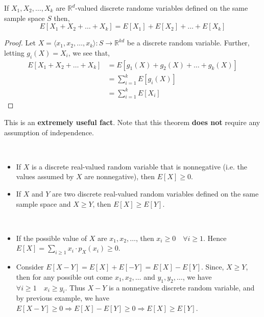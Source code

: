 \begin{theorem}
    If $X_1, X_2, \dots, X_k$ are $\mathbb{R}^d$-valued discrete randome
variables defined on the same sample space $S$ then,
\begin{equation*}
    E[X_1 + X_2 + \dots + X_k] = E[X_1] + E[X_2] + \dots + E[X_k]   
\end{equation*}
\end{theorem}
\begin{proof}
    Let $X = \langle x_1, x_2, \dots, x_k \rangle : S \rightarrow
\mathbb{R}^{kd}$ be a discrete random variable. Further, letting $g_i(X) =
X_i$, we see that,
\begin{align*}
    E[X_1 + X_2 + \dots + X_k] &= E[g_1(X) + g_2(X) + \dots + g_k(X)]        \\
                               &= \sum_{i = 1}^k E[g_i(X)]                   \\
                               &= \sum_{i = 1}^k E[X_i]
\end{align*}
\end{proof}
This is an \textbf{extremely useful fact}. Note that this theorem \textbf{does
not} require any assumption of independence.

\begin{example} \quad                                                        \\
\begin{itemize}[noitemsep, topsep=0em]
    \item
    If $X$ is a discrete real-valued random variable that is nonnegative (i.e.
the values assumed by $X$ are nonnegative), then $E[X] \geq 0$.
    \item
    If $X$ and $Y$ are two discrete real-valued random variables defined on the
same sample space and $X \geq Y$, then $E[X] \geq E[Y]$.
\end{itemize}
\end{example}
\begin{solution} \quad                                                       \\
\begin{itemize}[noitemsep, topsep=0em]
    \item 
    If the possible value of $X$ are $x_1, x_2, \dots$, then $x_i \geq 0 \quad
\forall i \geq 1$. Hence $E[X] = \sum_{i \geq 1} x_i \cdot p_X(x_i) \geq 0$.
    \item
    Consider $E[X- Y] = E[X] + E[-Y] = E[X] - E[Y]$. Since, $X \geq Y$, then
for any possible out come $x_1, x_2, \dots$ and $y_1, y_2, \dots$, we have
$\forall i \geq 1 \quad x_i \geq y_i$. Thus $X - Y$ is a nonnegative discrete
random variable, and by previous example, we have $E[X - Y] \geq 0 \Rightarrow
E[X] - E[Y] \geq 0 \Rightarrow E[X] \geq E[Y]$.
\end{itemize}
\end{solution}

